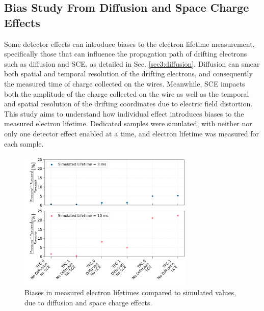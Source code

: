 \subsection{Bias Study From Diffusion and Space Charge Effects}
\label{sec7:etime_bias}

Some detector effects can introduce biases to the electron lifetime measurement, specifically those that can influence the propagation path of drifting electrons such as diffusion and SCE, as detailed
 in Sec. \ref{sec3:diffusion}.
Diffusion can smear both spatial and temporal resolution of the drifting electrons, and consequently the measured time of charge collected on the wires.
Meanwhile, SCE impacts both the amplitude of the charge collected on the wire as well as the temporal and spatial resolution of the drifting coordinates due to electric field distortion.
This study aims to understand how individual effect introduces biases to the measured electron lifetime.
Dedicated samples were simulated, with neither nor only one detector effect enabled at a time, and electron lifetime was measured for each sample.

\begin{figure}[bp!] 
\centering    
\includegraphics[width=0.75\textwidth]{etime_biases_compare}
\caption[etime_biases_compare]{
Biases in measured electron lifetimes compared to simulated values, due to diffusion and space charge effects.
}
\label{fig:etime_biases_compare}
\end{figure}

